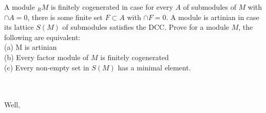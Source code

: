 A module $_RM$ is finitely cogenerated in case for every $A$ of submodules of $M$ with $\cap A=0$, there
is some finite set $F\subset A$ with $\cap F=0$. A module is artinian in case its lattice $S(M)$ of
submodules satisfies the DCC. Prove for a module $M$, the following are equivalent:\\
(a) M is artinian\\
(b) Every factor module of $M$ is finitely cogenerated\\
(c) Every non-empty set in $S(M)$ has a minimal element.\\\\

\begin{solution}\renewcommand{\qedsymbol}{}\ \\
    Well,
\end{solution}